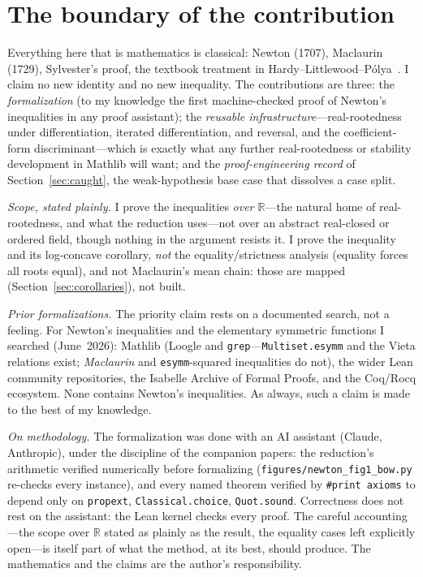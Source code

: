 \documentclass[11pt]{article}
\newcommand{\lean}[1]{\texttt{#1}}
\newcommand{\R}{\mathbb{R}}
\begin{document}
\section{The boundary of the contribution}\label{sec:boundary}

Everything here that is mathematics is classical: Newton (1707), Maclaurin (1729), Sylvester's
proof, the textbook treatment in Hardy--Littlewood--P\'olya~\cite{HLP}. I claim no new identity and
no new inequality. The contributions are three: the \emph{formalization} (to my knowledge the first
machine-checked proof of Newton's inequalities in any proof assistant); the \emph{reusable
infrastructure}---real-rootedness under differentiation, iterated differentiation, and reversal,
and the coefficient-form discriminant---which is exactly what any further real-rootedness or
stability development in Mathlib will want; and the \emph{proof-engineering record} of
Section~\ref{sec:caught}, the weak-hypothesis base case that dissolves a case split.

\emph{Scope, stated plainly.} I prove the inequalities \emph{over $\R$}---the natural home of
real-rootedness, and what the reduction uses---not over an abstract real-closed or ordered field,
though nothing in the argument resists it. I prove the inequality and its log-concave corollary,
\emph{not} the equality/strictness analysis (equality forces all roots equal), and not Maclaurin's
mean chain: those are mapped (Section~\ref{sec:corollaries}), not built.

\emph{Prior formalizations.} The priority claim rests on a documented search, not a feeling. For
Newton's inequalities and the elementary symmetric functions I searched (June~2026): Mathlib
(Loogle and \lean{grep}---\lean{Multiset.esymm} and the Vieta relations exist; \emph{Maclaurin} and
\lean{esymm}-squared inequalities do not), the wider Lean community repositories, the Isabelle
Archive of Formal Proofs, and the Coq/Rocq ecosystem. None contains Newton's inequalities. As
always, such a claim is made to the best of my knowledge.

\emph{On methodology.} The formalization was done with an AI assistant (Claude, Anthropic), under
the discipline of the companion papers: the reduction's arithmetic verified numerically before
formalizing (\lean{figures/newton\_fig1\_bow.py} re-checks every instance), and every named theorem
verified by \lean{\#print axioms} to depend only on \lean{propext}, \lean{Classical.choice},
\lean{Quot.sound}. Correctness does not rest on the assistant: the Lean kernel checks every proof.
The careful accounting---the scope over $\R$ stated as plainly as the result, the equality cases
left explicitly open---is itself part of what the method, at its best, should produce. The
mathematics and the claims are the author's responsibility.
\end{document}
